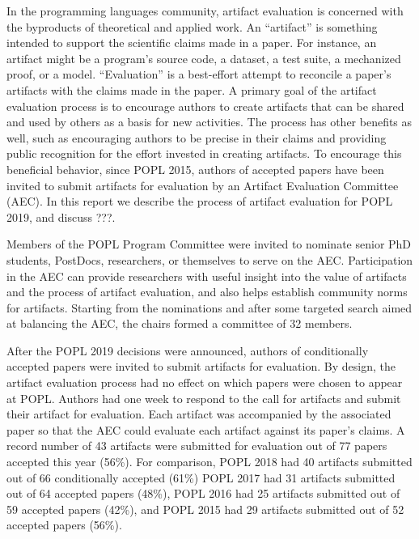 \label{aec}

In the programming languages community, artifact evaluation is concerned with
the byproducts of theoretical and applied work. An ``artifact'' is something
intended to support the scientific claims made in a paper. For instance, an
artifact might be a program’s source code, a dataset, a test suite, a mechanized
proof, or a model. ``Evaluation'' is a best-effort attempt to reconcile a paper’s
artifacts with the claims made in the paper. A primary goal of the artifact
evaluation process is to encourage authors to create artifacts that can be
shared and used by others as a basis for new activities. The process has other
benefits as well, such as encouraging authors to be precise in their claims and
providing public recognition for the effort invested in creating artifacts. To
encourage this beneficial behavior, since POPL 2015, authors of accepted papers
have been invited to submit artifacts for evaluation by an Artifact Evaluation
Committee (AEC). In this report we describe the process of artifact evaluation
for POPL 2019, and discuss ???.

Members of the POPL Program Committee were invited to nominate senior PhD
students, PostDocs, researchers, or themselves to serve on the AEC.
Participation in the AEC can provide researchers with useful insight into the
value of artifacts and the process of artifact evaluation, and also helps
establish community norms for artifacts. Starting from the nominations and after
some targeted search aimed at balancing the AEC, the chairs formed a committee
of 32 members.

After the POPL 2019 decisions were announced, authors of conditionally accepted
papers were invited to submit artifacts for evaluation. By design, the artifact
evaluation process had no effect on which papers were chosen to appear at POPL.
Authors had one week to respond to the call for artifacts and submit their
artifact for evaluation.
Each artifact was accompanied by the associated paper so that the AEC
could evaluate each artifact against its paper's claims. A record
number of 43 artifacts were submitted for evaluation out of 77 papers
accepted this year (56\%). For comparison,
POPL 2018 had 40 artifacts submitted out of 66 conditionally accepted (61\%) 
POPL 2017 had 31 artifacts submitted out of 64 accepted papers (48\%),
POPL 2016 had 25 artifacts submitted out of 59 accepted papers (42\%), and
POPL 2015 had 29 artifacts submitted out of 52 accepted papers (56\%).

